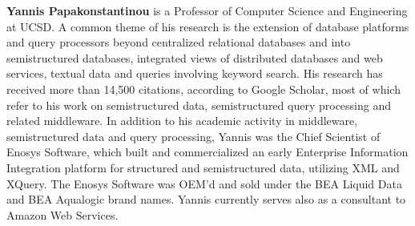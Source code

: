 \textbf{Yannis Papakonstantinou} is a Professor of Computer Science and Engineering at UCSD. A common theme of his research is the extension of database platforms and query processors beyond centralized relational databases and into semistructured databases, integrated views of distributed databases and web services, textual data and queries involving keyword search. His research has received more than 14,500 citations, according to Google Scholar, most of which refer to his work on semistructured data, semistructured query processing and related middleware.
In addition to his academic activity in middleware, semistructured data and query processing, Yannis was the Chief Scientist of Enosys Software, which built and commercialized an early Enterprise Information Integration platform for structured and semistructured data, utilizing XML and XQuery. The Enosys Software was OEM'd and sold under the BEA Liquid Data and BEA Aqualogic brand names. Yannis currently serves also as a consultant to Amazon Web Services.

